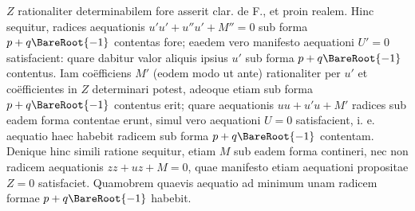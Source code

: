 $Z$ rationaliter determinabilem fore asserit clar. de F., et proin realem. Hinc sequitur, radices aequationis $u'u'+u''u'+M''=0$ sub forma $p+q\BareRoot{-1}$ contentas fore; eaedem vero manifesto aequationi $U'=0$ satisfacient: quare dabitur valor aliquis ipsius $u'$ sub forma $p+q\BareRoot{-1}$ contentus. Iam coëfficiens $M'$ (eodem modo ut ante) rationaliter per $u'$ et coëfficientes in $Z$ determinari potest, adeoque etiam sub forma $p+q\BareRoot{-1}$ contentus erit; quare aequationis $uu+u'u+M'$ radices sub eadem forma contentae erunt, simul vero aequationi $U=0$ satisfacient, i. e. aequatio haec habebit radicem sub forma $p+q\BareRoot{-1}$ contentam. Denique hinc simili ratione sequitur, etiam $M$ sub eadem forma contineri, nec non radicem aequationis $zz+uz+M=0$, quae manifesto etiam aequationi propositae $Z=0$ satisfaciet. Quamobrem quaevis aequatio ad minimum unam radicem formae $p+q\BareRoot{-1}$ habebit.

